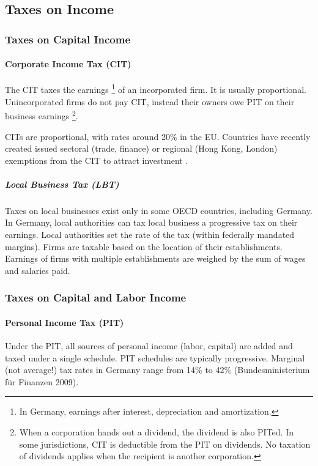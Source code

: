 \subsection{Taxes on Income}

\subsubsection{Taxes on Capital Income}

\paragraph{Corporate Income Tax (CIT)}  \label{sec:CIT} The  \gls{CIT} taxes the earnings
\footnote{
	In Germany, earnings after interest, depreciation and amortization.
}
of an incorporated firm.
It is usually proportional.
Unincorporated firms do not pay \gls{CIT}, instead their owners owe \gls{PIT} on their business earnings
\footnote{
	When a corporation hands out a dividend, the dividend is also \gls{PIT}ed.
	In some jurisdictions, \gls{CIT} is deductible from the \gls{PIT} on dividends.
	No taxation of dividends applies when the recipient is another corporation.
}.

\glspl{CIT} are proportional, with rates around 20\% in the EU.
Countries have recently created issued sectoral (trade, finance) or regional (Hong Kong, London) exemptions from the \gls{CIT} to attract investment \citep{Genschel2009,Ganghof2007,Genschel2005}.

\subparagraph{Local Business Tax (LBT)}  \label{sec:LBT} Taxes on local businesses exist only in some OECD countries, including Germany.
In Germany, local authorities can tax local business a progressive tax on their earnings.
Local authorities set the rate of the tax (within federally mandated margins).
Firms are taxable based on the location of their establishments.
Earnings of firms with multiple establishments are weighed by the sum of wages and salaries paid.

\subsubsection{Taxes on Capital and Labor Income}

\paragraph{Personal Income Tax (PIT)}  \label{sec:PIT} Under the  \gls{PIT}, all sources of personal income (labor, capital) are added and taxed under a single schedule.
\gls{PIT} schedules are typically progressive.
Marginal (not average!) tax rates in Germany range from 14\% to 42\% (Bundesministerium für Finanzen 2009).

